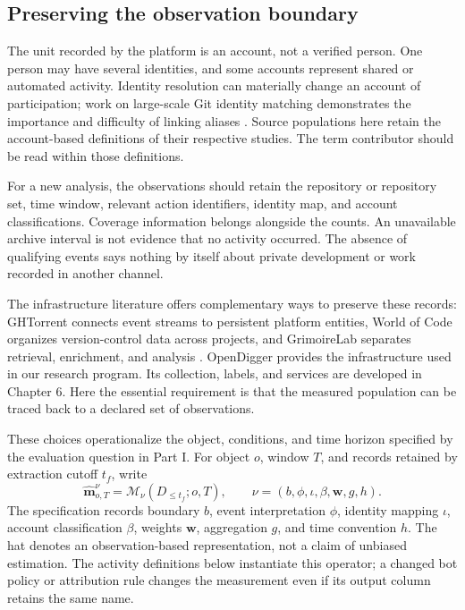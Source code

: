 \subsection{Preserving the observation boundary}
The unit recorded by the platform is an account, not a verified person. One person may have several identities, and some accounts represent shared or automated activity. Identity resolution can materially change an account of participation; work on large-scale Git identity matching demonstrates the importance and difficulty of linking aliases \citep{fry2020}. Source populations here retain the account-based definitions of their respective studies. The term contributor should be read within those definitions.

For a new analysis, the observations should retain the repository or repository set, time window, relevant action identifiers, identity map, and account classifications. Coverage information belongs alongside the counts. An unavailable archive interval is not evidence that no activity occurred. The absence of qualifying events says nothing by itself about private development or work recorded in another channel.

The infrastructure literature offers complementary ways to preserve these records: GHTorrent connects event streams to persistent platform entities, World of Code organizes version-control data across projects, and GrimoireLab separates retrieval, enrichment, and analysis \citep{gousios2012,ma2019,duenas2021}. OpenDigger provides the infrastructure used in our research program. Its collection, labels, and services are developed in Chapter 6. Here the essential requirement is that the measured population can be traced back to a declared set of observations.

These choices operationalize the object, conditions, and time horizon specified by the evaluation question in Part I. For object \(o\), window \(T\), and records retained by extraction cutoff \(t_f\), write
\begin{equation}
\widehat{\boldsymbol m}_{o,T}^{\nu}
=\mathcal M_{\nu}(D_{\leq t_f};o,T),
\qquad \nu=(b,\phi,\iota,\beta,\boldsymbol w,g,h).
\label{eq:ch4-measurement}
\end{equation}
The specification records boundary \(b\), event interpretation \(\phi\), identity mapping \(\iota\), account classification \(\beta\), weights \(\boldsymbol w\), aggregation \(g\), and time convention \(h\). The hat denotes an observation-based representation, not a claim of unbiased estimation. The activity definitions below instantiate this operator; a changed bot policy or attribution rule changes the measurement even if its output column retains the same name.

